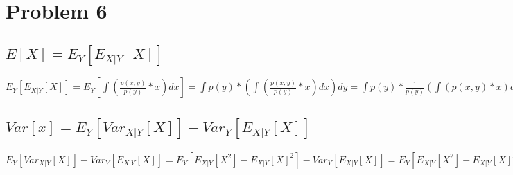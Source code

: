 \section{Problem 6}
\subsection{$E[X] = E_Y[E_{X|Y}[X]] $}

$E_Y[E_{X|Y}[X]] = E_Y[\int(\frac{p(x,y)}{p(y)}*x)dx] = \int p(y) * (\int(\frac{p(x,y)}{p(y)}*x)dx) dy = \int p(y) * \frac{1}{p(y)} (\int(p(x,y)*x)dx) dy = \int (\int(p(x,y)*x)dx) dy = E[X] $ 

\subsection{$Var[x] = E_Y[Var_{X|Y}[X]]-Var_Y[E_{X|Y}[X]]$}
$E_Y[Var_{X|Y}[X]]-Var_Y[E_{X|Y}[X]] = E_Y[E_{X|Y}[X^2]-E_{X|Y}[X]^2]-Var_Y[E_{X|Y}[X]] = 
E_Y[E_{X|Y}[X^2]-E_{X|Y}[X]^2]-E_Y[E_{X|Y}[X]^2] -E_Y[E_{X|Y}[X]]^2 = 
E_Y[E_{X|Y}[X^2]] - E_Y[E_{X|Y}[X]]^2 =
 E[X^2]-E[X]^2 =Var[X]$